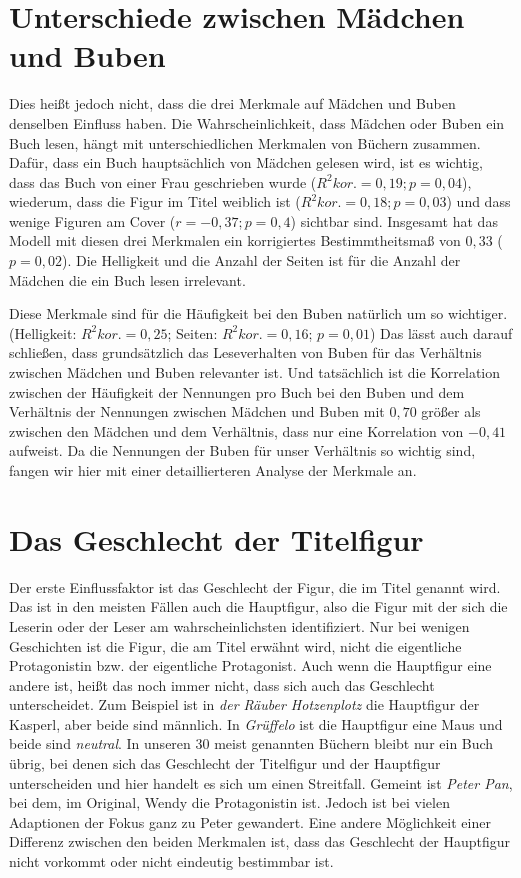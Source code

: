 

\section{Unterschiede zwischen Mädchen und Buben}

Dies heißt jedoch nicht, dass die drei Merkmale auf Mädchen und Buben
denselben Einfluss haben. Die Wahrscheinlichkeit, dass Mädchen oder
Buben ein Buch lesen, hängt mit unterschiedlichen Merkmalen von Büchern
zusammen. Dafür, dass ein Buch hauptsächlich von Mädchen gelesen wird,
ist es wichtig, dass das Buch von einer Frau geschrieben wurde
($R^2 \scriptstyle kor.\textstyle =0{,}19; p=0{,}04$), wiederum, dass
die Figur im Titel weiblich ist
($R^{2}\scriptstyle kor.\textstyle =0{,}18; p=0{,}03$) und dass wenige
Figuren am Cover ($r=-0{,}37; p=0{,}4$) sichtbar sind. Insgesamt hat das
Modell mit diesen drei Merkmalen ein korrigiertes Bestimmtheitsmaß von
$0{,}33$ ($p=0{,}02$). Die Helligkeit und die Anzahl der Seiten ist für
die Anzahl der Mädchen die ein Buch lesen irrelevant.

Diese Merkmale sind für die Häufigkeit bei den Buben natürlich um so
wichtiger. (Helligkeit: $R^2 \scriptstyle kor.\textstyle =0{,}25$;
Seiten: $R^2 \scriptstyle kor.\textstyle =0{,}16$; $p=0{,}01$) Das lässt
auch darauf schließen, dass grundsätzlich das Leseverhalten von Buben
für das Verhältnis zwischen Mädchen und Buben relevanter ist. Und
tatsächlich ist die Korrelation zwischen der Häufigkeit der Nennungen
pro Buch bei den Buben und dem Verhältnis der Nennungen zwischen Mädchen
und Buben mit $0{,}70$ größer als zwischen den Mädchen und dem
Verhältnis, dass nur eine Korrelation von $-0{,}41$ aufweist. Da die
Nennungen der Buben für unser Verhältnis so wichtig sind, fangen wir
hier mit einer detaillierteren Analyse der Merkmale an.

\section{Das Geschlecht der Titelfigur}

Der erste Einflussfaktor ist das Geschlecht der Figur, die im Titel
genannt wird. Das ist in den meisten Fällen auch die Hauptfigur, also
die Figur mit der sich die Leserin oder der Leser am wahrscheinlichsten
identifiziert. Nur bei wenigen Geschichten ist die Figur, die am Titel
erwähnt wird, nicht die eigentliche Protagonistin bzw. der eigentliche
Protagonist. Auch wenn die Hauptfigur eine andere ist, heißt das noch
immer nicht, dass sich auch das Geschlecht unterscheidet. Zum Beispiel
ist in \emph{der Räuber Hotzenplotz} die Hauptfigur der Kasperl, aber
beide sind männlich. In \emph{Grüffelo} ist die Hauptfigur eine Maus und
beide sind \emph{neutral}. In unseren 30 meist genannten Büchern bleibt
nur ein Buch übrig, bei denen sich das Geschlecht der Titelfigur und der
Hauptfigur unterscheiden und hier handelt es sich um einen Streitfall.
Gemeint ist \emph{Peter Pan}, bei dem, im Original, Wendy die
Protagonistin ist. Jedoch ist bei vielen Adaptionen der Fokus ganz zu
Peter gewandert. Eine andere Möglichkeit einer Differenz zwischen den
beiden Merkmalen ist, dass das Geschlecht der Hauptfigur nicht vorkommt
oder nicht eindeutig bestimmbar ist.

